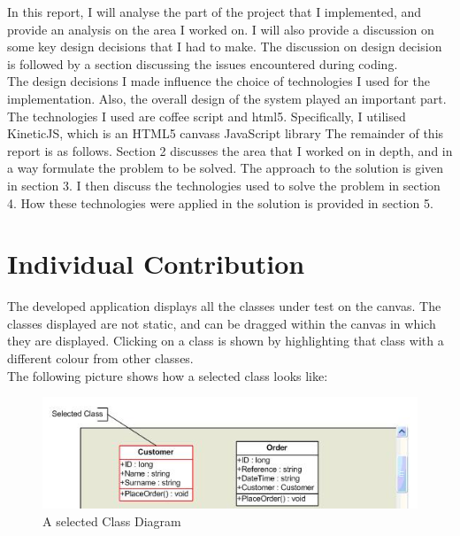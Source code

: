 \documentclass[a4paper,12pt]{article}
\begin{document}
\indent In this report, I will analyse the part of the project that I implemented, and provide an analysis on the area I worked on. I will also provide a discussion on some key design decisions that I had to make. The discussion on design decision is followed by a section discussing the issues encountered during coding.\\

\indent The design decisions I made influence the choice of technologies I used for the implementation. Also, the overall design of the system played an important part. The technologies I used are coffee script and html5. Specifically, I utilised KineticJS, which is an HTML5 canvass JavaScript library
The remainder of this report is as follows. Section 2 discusses the area that I worked on in depth, and in a way formulate the problem to be solved. The approach to the solution is given in section 3. I then discuss the technologies used to solve the problem in section 4. How these technologies were applied in the solution is provided in section 5. 

\section{Individual Contribution}
The developed application displays all the classes under test on the canvas. The classes displayed are not static, and can be dragged within the canvas in which they are displayed. Clicking on a class is shown by highlighting that class with a different colour from other classes.\\

\indent The following picture shows how a selected class looks like: 
\begin{figure} [H]
\includegraphics[scale=0.8] {capture.png}
\caption{A selected Class Diagram}
\label{mdp}
\end{figure}
\end{document}
